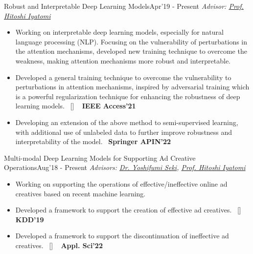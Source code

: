 
\begin{projects}

	\project
	{Robust and Interpretable Deep Learning Models}{Apr'19 - Present}
	{
		\textit{Advisor:  \href{https://iyatomi-lab.info/english/people/2013-6-8}{Prof. Hitoshi Iyatomi}}
	}
	{\begin{itemize}
			\setlength\itemsep{0.3em}
			\item Working on interpretable deep learning models, especially for natural language processing (NLP). Focusing on the vulnerability of perturbations in the attention mechanisms, developed new training technique to overcome the weakness, making attention mechanisms more robust and interpretable.
			\item Developed a general training technique to overcome the vulnerability to perturbations in attention mechanisms, inspired by adversarial training which is a powerful regularization technique for enhancing the robustness of deep learning models.~ [\href{http://shunk031.github.io/attention-meets-perturbation/}{\small{\websiteSymbol}}] ~ {\small{\lbrack\textbf{{IEEE Access'21}}\rbrack}}
			\item Developing an extension of the above method to semi-supervised learning, with additional use of unlabeled data to further improve robustness and interpretability of the model.~ {\small{\lbrack\textbf{{Springer APIN'22}}\rbrack}}
		\end{itemize}}

	\project
	{Multi-modal Deep Learning Models for Supporting Ad Creative Operations}{Aug'18 - Present}
	{
		\textit{Advisors:  \href{https://scholar.google.com/citations?user=LoZ7VeYAAAAJ}{Dr. Yoshifumi Seki}, \href{https://iyatomi-lab.info/english/people/2013-6-8}{Prof. Hitoshi Iyatomi}}
	}
	{\begin{itemize}
			\setlength\itemsep{0.3em}
			\item Working on supporting the operations of effective/ineffective online ad creatives based on recent machine learning.
			\item Developed a framework to support the creation of effective ad creatives.~ [\href{https://github.com/shunk031/Multi-task-Conditional-Attention-Networks}{\small{\githubSymbol}}] ~ {\small{\lbrack\textbf{{KDD'19}}\rbrack}}
			\item Developed a framework to support the discontinuation of ineffective ad creatives.~ [\href{https://www.mdpi.com/2076-3417/12/7/3594}{\small{\websiteSymbol}}] ~ {\small{\lbrack\textbf{{Appl. Sci'22}}\rbrack}}
		\end{itemize}}


\end{projects}
